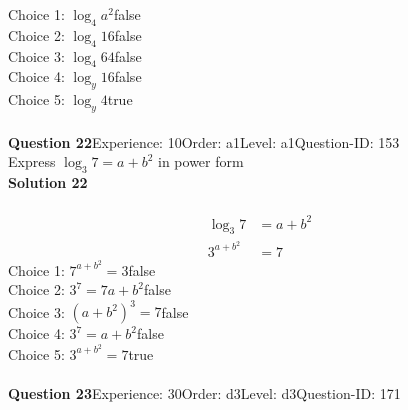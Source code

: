 \documentclass{article}
\begin{document}
Choice 1: \hspace{20pt}$\log_{4}a^2$\hspace{20pt}false\\
Choice 2: \hspace{20pt}$\log_{4}16$\hspace{20pt}false\\
Choice 3: \hspace{20pt}$\log_{4}64$\hspace{20pt}false\\
Choice 4: \hspace{20pt}$\log_{y}16$\hspace{20pt}false\\
Choice 5: \hspace{20pt}$\log_{y}4$\hspace{20pt}true\\
\\[4pt]
\noindent\textbf{Question 22}\hspace{20pt}Experience: 10\hspace{20pt}Order: a1\hspace{20pt}Level: a1\hspace{20pt}Question-ID: 153\\[2pt]
Express $\log_{3}7=a+b^2$ in power form\\[4pt]
\noindent\textbf{Solution 22}\\[2pt]
\\[-35pt]\begin{align*}
\log_{3}7&=a+b^2\\[2pt]
3^{a+b^2}&=7
\end{align*}
Choice 1: \hspace{20pt}$7^{a+b^2}=3$\hspace{20pt}false\\
Choice 2: \hspace{20pt}$3^7=7a+b^2$\hspace{20pt}false\\
Choice 3: \hspace{20pt}$(a+b^2)^3=7$\hspace{20pt}false\\
Choice 4: \hspace{20pt}$3^{7}=a+b^2$\hspace{20pt}false\\
Choice 5: \hspace{20pt}$3^{a+b^2}=7$\hspace{20pt}true\\
\\[4pt]
\noindent\textbf{Question 23}\hspace{20pt}Experience: 30\hspace{20pt}Order: d3\hspace{20pt}Level: d3\hspace{20pt}Question-ID: 171\\[2pt]
\end{document}
